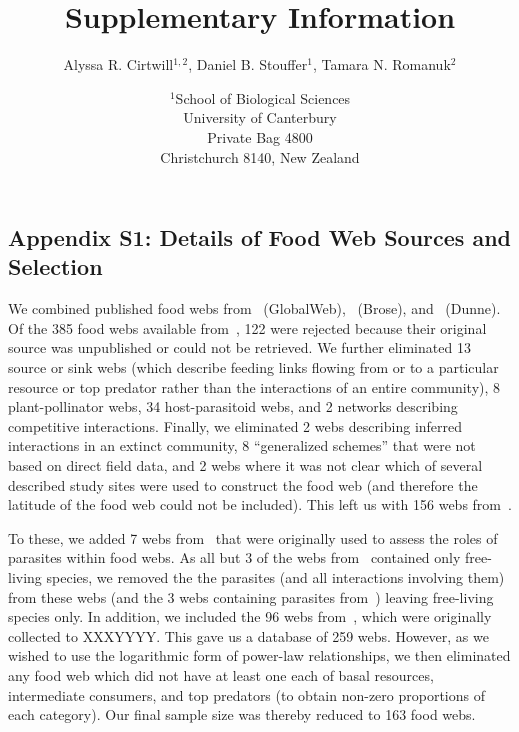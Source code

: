 \documentclass[12pt]{article}
\title{Supplementary Information}
\author{Alyssa R. Cirtwill$^{1,2}$, Daniel B. Stouffer$^{1}$, Tamara N. Romanuk$^{2}$}
\date{$^1$School of Biological Sciences\\University of Canterbury\\
Private Bag 4800\\Christchurch 8140, New Zealand}
\newcommand{\beginsupplement}{%
        \setcounter{table}{0}
        \renewcommand{\thetable}{S\arabic{table}}%
        \setcounter{figure}{0}
        \renewcommand{\thefigure}{S\arabic{figure}}%
     }
\begin{document}
\maketitle
\baselineskip=8.5mm

\vspace{0.4 in}
\beginsupplement
\begin{landscape}
\subsection*{Appendix S1: Details of Food Web Sources and Selection}

  We combined published food webs from~\citet{GlobaWeb} (GlobalWeb),~\citet{Brose2006} (Brose), 
  and~\citet{Dunne2013} (Dunne).
  Of the 385 food webs available from~\citet{Globalweb}, 122 were rejected because their original
  source was unpublished or could not be retrieved. We further eliminated 13 source or sink webs
  (which describe feeding links flowing from or to a particular resource or top predator rather
  than the interactions of an entire community), 8 plant-pollinator webs, 34 host-parasitoid webs,
  and 2 networks describing competitive interactions. Finally, we eliminated 2 webs describing 
  inferred interactions in an extinct community, 8 ``generalized schemes'' that were not based
  on direct field data, and 2 webs where it was not clear which of several described study sites
  were used to construct the food web (and therefore the latitude of the food web could not be 
  included). This left us with 156 webs from~\citet{GlobalWeb}.


  To these, we added 7 webs from~\citet{Dunne2013} that were originally used to assess the roles
  of parasites within food webs. As all but 3 of the webs from~\citet{GlobalWeb} contained only
  free-living species, we removed the the parasites (and all interactions involving them) from
  these webs (and the 3 webs containing parasites from~\citet{GlobalWeb}) leaving free-living 
  species only. In addition, we included the 96 webs from~\citet{Brose2006}, which were originally
  collected to XXXYYYY. This gave us a database of 259 webs. However, as we wished to use the
  logarithmic form of power-law relationships, we then eliminated any food web which did not have
  at least one each of basal resources, intermediate consumers, and top predators (to obtain non-zero
  proportions of each category). Our final sample size was thereby reduced to 163 food webs.




\end{landscape}
\end{document}
